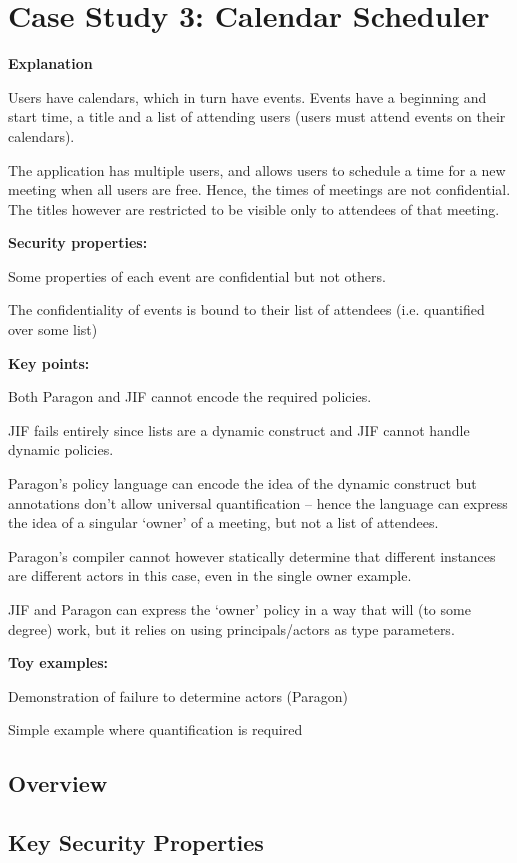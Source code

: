 \section{Case Study 3: Calendar Scheduler}

\textbf{Explanation}

Users have calendars, which in turn have events. Events have a beginning and start time, a title and a list of attending users (users must attend events on their calendars).

The application has multiple users, and allows users to schedule a time for a new meeting when all users are free. Hence, the times of meetings are not confidential. The titles however are restricted to be visible only to attendees of that meeting.

\textbf{Security properties:}

Some properties of each event are confidential but not others.

The confidentiality of events is bound to their list of attendees (i.e. quantified over some list)

\textbf{Key points:}

Both Paragon and JIF cannot encode the required policies.

JIF fails entirely since lists are a dynamic construct and JIF cannot handle dynamic policies.

Paragon's policy language can encode the idea of the dynamic construct but annotations don't allow universal quantification -- hence the language can express the idea of a singular `owner' of a meeting, but not a list of attendees.

Paragon's compiler cannot however statically determine that different instances are different actors in this case, even in the single owner example.

JIF and Paragon can express the `owner' policy in a way that will (to some degree) work, but it relies on using principals/actors as type parameters.

\textbf{Toy examples:}

Demonstration of failure to determine actors (Paragon)

Simple example where quantification is required

\newpage

\subsection{Overview}

\subsection{Key Security Properties}

